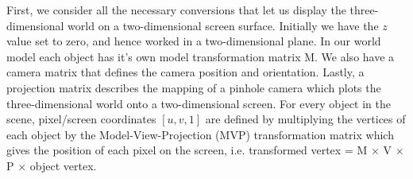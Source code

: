 \documentclass[paper=a4, fontsize=11pt]{scrartcl} %
\numberwithin{equation}{section} %
\numberwithin{figure}{section} %
\numberwithin{table}{section} %
\begin{document}
First, we consider all the necessary conversions that let us display the three-dimensional world on a two-dimensional screen surface. Initially we have the \(z\) value set to zero, and hence worked in a two-dimensional plane. In our world model each object has it's own model transformation matrix M. We also have a camera matrix that defines the camera position and orientation. Lastly, a projection matrix describes the mapping of a pinhole camera which plots the three-dimensional world onto a two-dimensional screen. For every object in the scene, pixel/screen coordinates \([u, v, 1]\) are defined by multiplying the vertices of each object by the Model-View-Projection (MVP) transformation matrix which gives the position of each pixel on the screen, i.e. transformed vertex = M \(\times\) V \(\times\) P \(\times\) object vertex. \\


\lstset{
  frame=top,frame=bottom,
  basicstyle=\small\normalfont\sffamily,
  }



\end{document}
